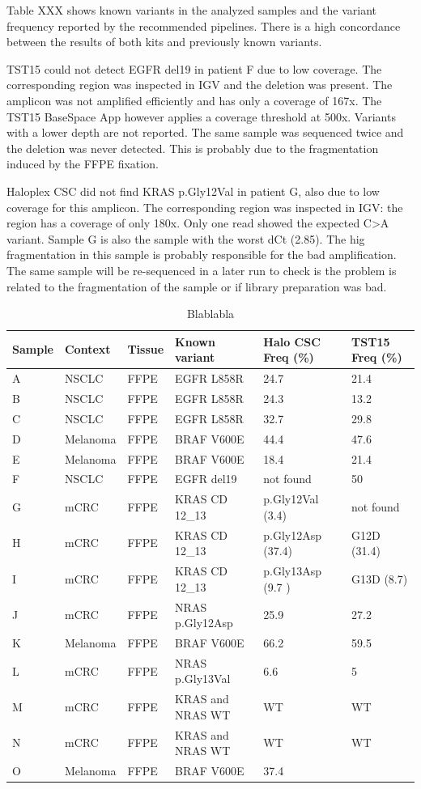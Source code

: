 Table XXX shows known variants in the analyzed samples and the variant frequency
reported by the recommended pipelines. There is a high concordance between  the
results of both kits and previously known variants.

TST15 could not detect EGFR del19 in patient F due to low coverage. The
corresponding region was inspected in IGV and the deletion was present.  The
amplicon was not amplified  efficiently and has only a coverage of 167x. The
TST15 BaseSpace App however  applies a coverage threshold at 500x. Variants with
a lower depth are not reported. The same sample was sequenced twice and the
deletion was never detected. This is probably due to the fragmentation induced
by the FFPE fixation.

Haloplex CSC did not find KRAS p.Gly12Val in patient G, also due to low coverage
for this amplicon. The corresponding region was inspected in IGV: the region has
a coverage of only 180x. Only one read showed the expected C>A variant.  Sample
G is also the sample with the worst dCt (2.85). The  hig fragmentation in this
sample is probably responsible for the bad amplification. The same sample will
be re-sequenced in a later run to check  is the problem is related to the
fragmentation of the sample or if library preparation was bad.

\begin{table}[!htbp]
  \caption[failed_halo]{Blablabla}
  \centering
    \begin{tabular}{| p{1.2cm} | p{1.7cm} | p{1cm} | p{3.5cm} | p{3cm} | p{2.5cm} |}
      \hline
      Sample & Context & Tissue & Known variant & Halo CSC Freq (\%) & TST15 Freq (\%) \\ \hline \hline
      A & NSCLC & FFPE & EGFR L858R & 24.7 & 21.4 \\
      B & NSCLC & FFPE & EGFR L858R & 24.3 & 13.2 \\
      C & NSCLC & FFPE & EGFR L858R & 32.7 & 29.8\\
      D & Melanoma & FFPE & BRAF V600E & 44.4 & 47.6 \\
      E & Melanoma & FFPE & BRAF V600E & 18.4 & 21.4 \\
      F & NSCLC & FFPE & EGFR del19 & not found & 50 \\
      G & mCRC & FFPE & KRAS CD 12\_13 & p.Gly12Val (3.4) & not found \\
      H & mCRC & FFPE & KRAS CD 12\_13  & p.Gly12Asp (37.4) & G12D (31.4)\\
      I & mCRC & FFPE & KRAS CD 12\_13  & p.Gly13Asp (9.7 )& G13D (8.7) \\
      J & mCRC & FFPE & NRAS p.Gly12Asp & 25.9 & 27.2 \\
      K & Melanoma & FFPE & BRAF V600E & 66.2 & 59.5 \\
      L & mCRC & FFPE & NRAS p.Gly13Val & 6.6 & 5 \\
      M & mCRC & FFPE & KRAS and NRAS WT & WT & WT \\
      N & mCRC & FFPE & KRAS and NRAS WT & WT & WT \\
      O & Melanoma & FFPE &BRAF V600E & 37.4 & \\
      \hline
    \end{tabular}
\end{table}

